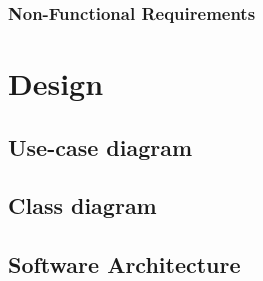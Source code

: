 \documentclass[10pt]{article}
\begin{document}
\subsubsection{Non-Functional Requirements}

\section{Design}

\subsection{Use-case diagram}

\subsection{Class diagram}

\subsection{Software Architecture}

\end{document}
